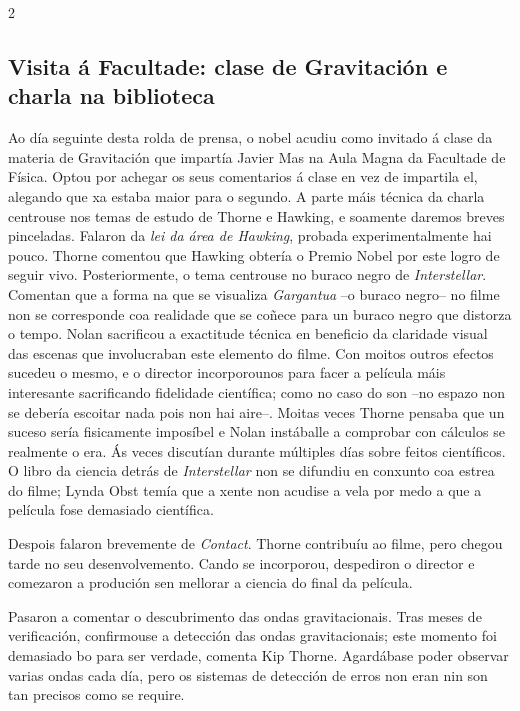 \begin{multicols}{2}

\subsection*{Visita á Facultade: clase de Gravitación e charla na biblioteca}

Ao día seguinte desta rolda de prensa, o nobel acudiu como invitado á clase da
materia de Gravitación que impartía Javier Mas na Aula Magna da Facultade de
Física. Optou por achegar os seus comentarios á clase en vez de impartila el,
alegando que xa estaba maior para o segundo. A parte máis técnica da charla
centrouse nos temas de estudo de Thorne e Hawking, e soamente daremos breves
pinceladas. Falaron da \emph{lei da área de Hawking}, probada experimentalmente
hai pouco. Thorne comentou que Hawking obtería o Premio Nobel por este logro de
seguir vivo. Posteriormente, o tema centrouse no buraco negro de
\emph{Interstellar}. Comentan que a forma na que se visualiza \emph{Gargantua}
--o buraco negro-- no filme non se corresponde coa realidade que se coñece para
un buraco negro que distorza o tempo. Nolan sacrificou a exactitude técnica en
beneficio da claridade visual das escenas que involucraban este elemento do
filme. Con moitos outros efectos sucedeu o mesmo, e o director incorporounos
para facer a película máis interesante sacrificando fidelidade científica; como
no caso do son --no espazo non se debería escoitar nada pois non hai aire--.
Moitas veces Thorne pensaba que un suceso sería fisicamente imposíbel e Nolan
instáballe a comprobar con cálculos se realmente o era. Ás veces discutían
durante múltiples días sobre feitos científicos. O libro da ciencia detrás de
\emph{Interstellar} non se difundiu en conxunto coa estrea do filme; Lynda Obst
temía que a xente non acudise a vela por medo a que a película fose demasiado
científica.

Despois falaron brevemente de \emph{Contact}. Thorne contribuíu ao filme, pero
chegou tarde no seu desenvolvemento. Cando se incorporou, despediron o director
e comezaron a produción sen mellorar a ciencia do final da película.

Pasaron a comentar o descubrimento das ondas gravitacionais. Tras meses de
verificación, confirmouse a detección das ondas gravitacionais; este momento
foi demasiado bo para ser verdade, comenta Kip Thorne. Agardábase poder
observar varias ondas cada día, pero os sistemas de detección de erros non eran
nin son tan precisos como se require.


\end{multicols}
